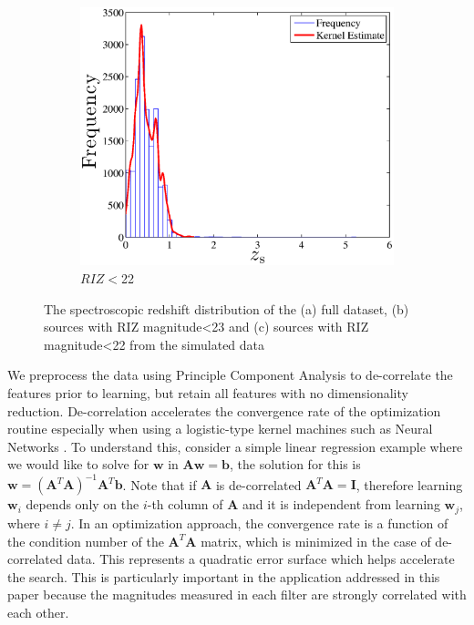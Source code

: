 \documentclass[useAMS,usenatbib,fleqn]{mn2e}
\begin{document}
\begin{figure}
        ~
        \begin{subfigure}[b]{1\columnwidth}
                 \includegraphics[width=\textwidth]{figures/zspec_22}
                 \caption{$RIZ<$22}
        \end{subfigure}
        
       \caption{The spectroscopic redshift distribution of the (a) full dataset, (b) sources with RIZ magnitude\textless23 and (c) sources with RIZ magnitude\textless22 from the simulated data}
	 \label{fig-zspec-histogram}
\end{figure}

We preprocess the data using Principle Component Analysis \citep[PCA;][]{jolliffe1986} to de-correlate the features prior to learning, but retain all features with no dimensionality reduction. De-correlation accelerates the convergence rate of the optimization routine especially when using a logistic-type kernel machines such as Neural Networks \citep{lecun1998}. To understand this, consider a simple linear regression example where we would like to solve for $\mathbf{w}$ in $\mathbf{A}\mathbf{w}=\mathbf{b}$, the solution for this is $\mathbf{w}=\left(\mathbf{A}^{T}\mathbf{A}\right)^{-1}\mathbf{A}^{T}\mathbf{b}$. Note that if $\mathbf{A}$ is de-correlated $\mathbf{A}^{T}\mathbf{A}=\mathbf{I}$, therefore learning $\mathbf{w}_{i}$ depends only on the $i$-th column of $\mathbf{A}$ and it is independent from learning $\mathbf{w}_{j}$, where $i\ne j$. In an optimization approach, the convergence rate is a function of the condition number of the $\mathbf{A}^{T}\mathbf{A}$ matrix, which is minimized in the case of de-correlated data. This represents a quadratic error surface which helps accelerate the search. This is particularly important in the application addressed in this paper because the magnitudes measured in each filter are strongly correlated with each other. 
\end{document}

